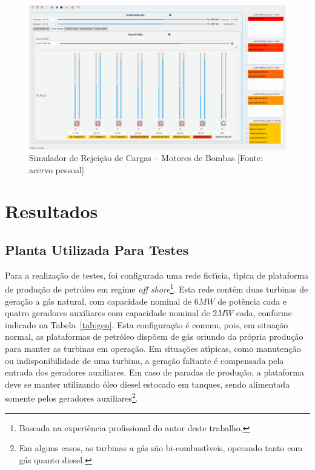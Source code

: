 \begin{figure}
	\centering
	\includegraphics[width=\linewidth]{figuras/simulator_pumps}
	\caption[Simulador de Rejei{\c c}{\~a}o de Cargas \--- Motores de Bombas]{Simulador de Rejei{\c c}{\~a}o de Cargas \--- Motores de Bombas [Fonte: acervo pessoal]}
	\label{fig:sim_pumps}
\end{figure}

\chapter{Resultados} \label{cap:teste}

\section{Planta Utilizada Para Testes} \label{sec:rede}

Para a realiza{\c c}{\~a}o de testes, foi configurada uma rede fict{\'\i}cia, t{\'\i}pica de plataforma de produ{\c c}{\~a}o de petr{\'o}leo em regime \textit{off shore}\footnote{Baseada na experi{\^e}ncia profissional do autor deste trabalho.}. Esta rede cont{\'e}m duas turbinas de gera{\c c}{\~a}o a g{\'a}s natural, com capacidade nominal de $6MW$ de pot{\^e}ncia cada e quatro geradores auxiliares com capacidade nominal de $2MW$ cada, conforme indicado na Tabela~\ref{tab:gen}. Esta configura{\c c}{\~a}o {\'e} comum, pois, em situa{\c c}{\~a}o normal, as plataformas de petr{\'o}leo disp{\~o}em de g{\'a}s oriundo da pr{\'o}pria produ{\c c}{\~a}o para manter as turbinas em opera{\c c}{\~a}o. Em situa{\c c}{\~o}es at{\'\i}picas, como manuten{\c c}{\~a}o ou indisponibilidade de uma turbina, a gera{\c c}{\~a}o faltante {\'e} compensada pela entrada dos geradores auxiliares. Em caso de paradas de produ{\c c}{\~a}o, a plataforma deve se manter utilizando {\'o}leo diesel estocado em tanques, sendo alimentada somente pelos geradores auxiliares\footnote{Em alguns casos, as turbinas a g{\'a}s s{\~a}o bi-combust{\'\i}veis, operando tanto com g{\'a}s quanto diesel.}.

